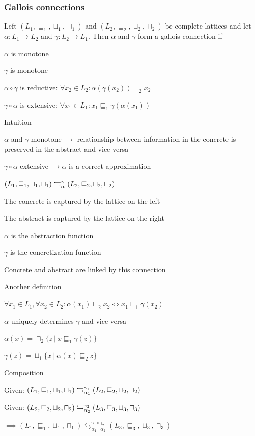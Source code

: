 \subsubsection{Gallois connections}
\enumstart
	\item Left $(L_1, \sqsubseteq_1, \sqcup_1, \sqcap_1)$ and $(L_2, \sqsubseteq_2, \sqcup_2, \sqcap_2)$ be complete lattices and let $\alpha: L_1 \rightarrow L_2$ and $\gamma: L_2 \rightarrow L_1$. Then $\alpha$ and $\gamma$ form a gallois connection if
	\enumstart
		\item $\alpha$ is monotone
		\item $\gamma$ is monotone
		\item $\alpha \circ \gamma$ is reductive: $\forall x_2 \in L_2: \alpha(\gamma(x_2)) \sqsubseteq_2 x_2$
		\item $\gamma \circ \alpha$ is extensive: $\forall x_1 \in L_1: x_1 \sqsubseteq_1 \gamma(\alpha(x_1))$
	\enumend
	\item Intuition
	\enumstart
		\item $\alpha$ and $\gamma$ monotone $\rightarrow$ relationship between information in the concrete is preserved in the abstract and vice versa
		\item $\gamma \circ \alpha$ extensive $\rightarrow \alpha$ is a correct approximation 
		\item $(L_1, \sqsubseteq_1, \sqcup_1, \sqcap_1) \Gallois[] (L_2, \sqsubseteq_2, \sqcup_2, \sqcap_2)$
		\enumstart
			\item The concrete is captured by the lattice on the left
			\item The abstract is captured by the lattice on the right
			\item $\alpha$ is the abstraction function
			\item $\gamma$ is the concretization function
			\item Concrete and abstract are linked by this connection
		\enumend
	\enumend
	\item Another definition
	\enumstart
		\item $\forall x_1 \in L_1, \forall x_2 \in L_2: \alpha(x_1) \sqsubseteq_2 x_2 \Leftrightarrow x_1 \sqsubseteq_1 \gamma(x_2)$
	\enumend
	\item $\alpha$ uniquely determines $\gamma$ and vice versa
	\enumstart
		\item $\alpha(x) = \sqcap_2\{z \ | \ x \sqsubseteq_1 \gamma(z)\}$
		\item $\gamma(z) = \sqcup_1\{x \ | \ \alpha(x) \sqsubseteq_2 z\}$
	\enumend
	\item Composition
	\enumstart
		\item Given: $(L_1, \sqsubseteq_1, \sqcup_1, \sqcap_1) \Gallois[1] (L_2, \sqsubseteq_2, \sqcup_2, \sqcap_2)$
		\item Given: $(L_2, \sqsubseteq_2, \sqcup_2, \sqcap_2) \Gallois[2] (L_3, \sqsubseteq_3, \sqcup_3, \sqcap_3)$
		\item $\implies (L_1, \sqsubseteq_1, \sqcup_1, \sqcap_1) \leftrightarrows^{\gamma_1 \circ \gamma_2}_{\alpha_1 \circ \alpha_2} (L_3, \sqsubseteq_3, \sqcup_3, \sqcap_3)$ 
	\enumend
\enumend

